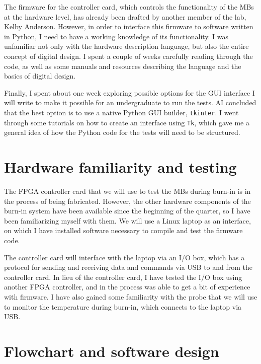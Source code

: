 \documentclass[11pt]{article}
\begin{document}
The firmware for the controller card, which controls the functionality of the MBs at the hardware level, has already been drafted by another member of the lab, Kelby Anderson.  However, in order to interface this firmware to software written in Python, I need to have a working knowledge of its functionality.  I was unfamiliar not only with the hardware description language, but also the entire concept of digital design.  I spent a couple of weeks carefully reading through the code, as well as some manuals and resources describing the language and the basics of digital design.

Finally, I spent about one week exploring possible options for the GUI interface I will write to make it possible for an undergraduate to run the tests.  AI concluded that the best option is to use a native Python GUI builder, \texttt{tkinter}.  I went through some tutorials on how to create an interface using \texttt{Tk}, which gave me a general idea of how the Python code for the tests will need to be structured.



\section{Hardware familiarity and testing}

The FPGA controller card that we will use to test the MBs during burn-in is in the process of being fabricated.  However, the other hardware components of the burn-in system have been available since the beginning of the quarter, so I have been familiarizing myself with them.  We will use a Linux laptop as an interface, on which I have installed software necessary to compile and test the firmware code.

The controller card will interface with the laptop via an I/O box, which has a protocol for sending and receiving data and commands via USB to and from the controller card.  In lieu of the controller card, I have tested the I/O box using another FPGA controller, and in the process was able to get a bit of experience with firmware.  I have also gained some familiarity with the probe that we will use to monitor the temperature during burn-in, which connects to the laptop via USB.



\section{Flowchart and software design}
\end{document}
